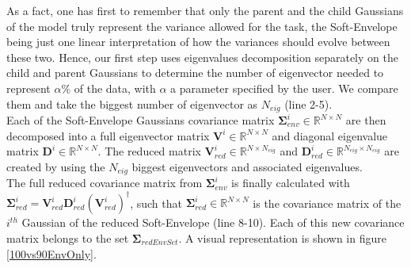 \documentclass[letterpaper, 10 pt, conference]{ieeeconf}  %
\newcommand{\mb}[1]{{\boldsymbol{#1}}}
\newcommand{\psin}{{\!\dagger}}
\begin{document}
As a fact, one has first to remember that only the parent and the child Gaussians of the model truly represent the variance allowed for the task, the Soft-Envelope being just one linear interpretation of how the variances should evolve between these two. Hence, our first step uses eigenvalues decomposition separately on the child and parent Gaussians to determine the number of eigenvector needed to represent $\alpha \%$ of the data, with $\alpha$ a parameter specified by the user. We compare them and take the biggest number of eigenvector as $N_{eig}$ (line 2-5). \\
 Each of the Soft-Envelope Gaussians covariance matrix $\mb{\Sigma}_{env}^i \in \mathbb{R}^{N \times N}$  are then decomposed into a full eigenvector matrix $\mb{V}^{i} \in \mathbb{R}^{N \times N}$ and diagonal eigenvalue matrix $\mb{D}^{i} \in \mathbb{R}^{N \times N}$. The reduced  matrix $\mb{V}_{red}^{i}\in \mathbb{R}^{N \times N_{eig}}$ and $\mb{D}_{red}^{i} \in \mathbb{R}^{N_{eig} \times N_{eig}}$ are created by using the $N_{eig}$ biggest eigenvectors and associated eigenvalues.\\
The full reduced covariance matrix from $\mb{\Sigma}_{env}^{i}$ is finally calculated with $\mb{\Sigma}_{red}^{i} =\mb{V}_{red}^{i} \mb{D}_{red}^{i}  (\mb{V}_{red}^{i})^{\psin}$, such that $\mb{\Sigma}_{red}^{i}  \in \mathbb{R}^{N \times N} $  is the covariance matrix of the $i^{th}$ Gaussian of the reduced Soft-Envelope (line 8-10). Each of this new covariance matrix belongs to the set $\mb{\Sigma}_{redEnvSet}$. A visual representation is shown in figure \ref{100vs90EnvOnly}.
\end{document}
